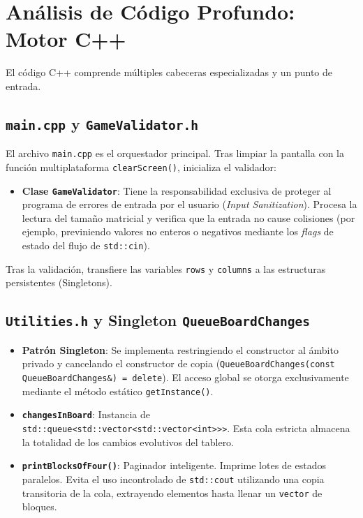 \documentclass[12pt,a4paper]{article}
\begin{document}
\section{Análisis de Código Profundo: Motor C++}
El código C++ comprende múltiples cabeceras especializadas y un punto de entrada.

\subsection{\texttt{main.cpp} y \texttt{GameValidator.h}}
El archivo \texttt{main.cpp} es el orquestador principal. Tras limpiar la pantalla con la función multiplataforma \texttt{clearScreen()}, inicializa el validador:
\begin{itemize}
    \item \textbf{Clase \texttt{GameValidator}}: Tiene la responsabilidad exclusiva de proteger al programa de errores de entrada por el usuario (\textit{Input Sanitization}). Procesa la lectura del tamaño matricial y verifica que la entrada no cause colisiones (por ejemplo, previniendo valores no enteros o negativos mediante los \textit{flags} de estado del flujo de \texttt{std::cin}). 
\end{itemize}
Tras la validación, transfiere las variables \texttt{rows} y \texttt{columns} a las estructuras persistentes (Singletons).

\subsection{\texttt{Utilities.h} y Singleton \texttt{QueueBoardChanges}}
\begin{itemize}
    \item \textbf{Patrón Singleton}: Se implementa restringiendo el constructor al ámbito privado y cancelando el constructor de copia (\texttt{QueueBoardChanges(const QueueBoardChanges\&) = delete}). El acceso global se otorga exclusivamente mediante el método estático \texttt{getInstance()}.
    \item \textbf{\texttt{changesInBoard}}: Instancia de \texttt{std::queue\textless std::vector\textless std::vector\textless int\textgreater\textgreater\textgreater}. Esta cola estricta almacena la totalidad de los cambios evolutivos del tablero.
    \item \textbf{\texttt{printBlocksOfFour()}}: Paginador inteligente. Imprime lotes de estados paralelos. Evita el uso incontrolado de \texttt{std::cout} utilizando una copia transitoria de la cola, extrayendo elementos hasta llenar un \texttt{vector} de bloques.
\end{itemize}
\end{document}
